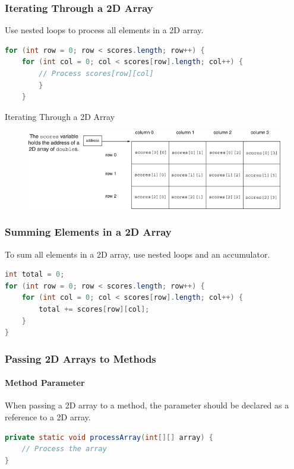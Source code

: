\documentclass[11pt]{beamer}
\begin{document}
\begin{frame}[fragile]
\frametitle{Iterating Through a 2D Array}
Use nested loops to process all elements in a 2D array.
\begin{lstlisting}[language=Java]
for (int row = 0; row < scores.length; row++) {
    for (int col = 0; col < scores[row].length; col++) {
        // Process scores[row][col]
        }
    }
\end{lstlisting}
\end{frame}

\begin{frame}{Iterating Through a 2D Array}
    \noindent 
    \begin{figure}[H]
    \centering
    \includegraphics[scale=0.6]{Images/chapter07_section09_fig20.png}
    \end{figure}       
\end{frame}

\begin{frame}[fragile]
\frametitle{Summing Elements in a 2D Array}

To sum all elements in a 2D array, use nested loops and an accumulator.

\begin{lstlisting}[language=Java]
int total = 0;
for (int row = 0; row < scores.length; row++) {
    for (int col = 0; col < scores[row].length; col++) {
        total += scores[row][col];
    }
}
\end{lstlisting}

\end{frame}

\begin{frame}[fragile]
\frametitle{Passing 2D Arrays to Methods}
\framesubtitle{Method Parameter}

When passing a 2D array to a method, the parameter should be declared as a reference to a 2D array.

\begin{lstlisting}[language=Java]
private static void processArray(int[][] array) {
    // Process the array
}
\end{lstlisting}

\end{frame}
\end{document}
